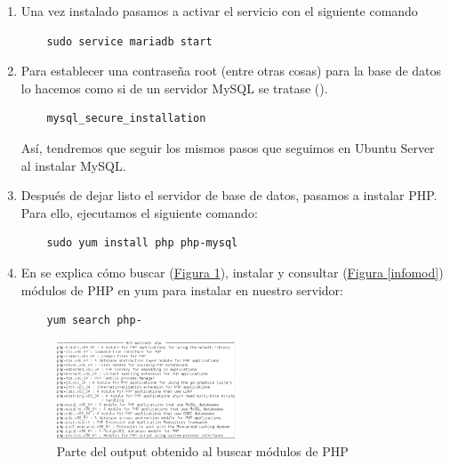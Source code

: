 \documentclass[10pt,a4paper,spanish]{article}
\numberwithin{equation}{section} %
\numberwithin{figure}{section} %
\numberwithin{table}{section} %
\begin{document}
\begin{enumerate}[1.]
    \item Una vez instalado pasamos a activar el servicio con el siguiente comando
    \begin{verbatim}
    sudo service mariadb start
    \end{verbatim}

    \item Para establecer una contraseña root (entre otras cosas) para la base de datos lo hacemos como si de un servidor MySQL se tratase (\cite{mariadb}).
    \begin{verbatim}
    mysql_secure_installation
    \end{verbatim}

    Así, tendremos que seguir los mismos pasos que seguimos en Ubuntu Server al instalar MySQL.

    \item Después de dejar listo el servidor de base de datos, pasamos a instalar PHP. Para ello, ejecutamos el siguiente comando:
    \begin{verbatim}
    sudo yum install php php-mysql        
    \end{verbatim}

    \item En \cite{digocean2} se explica cómo buscar (\hyperref[modulosphp]{Figura \ref*{modulosphp}}), instalar y consultar (\hyperref[infomod]{Figura \ref*{infomod}}) módulos de PHP en yum para instalar en nuestro servidor:
    \begin{verbatim}
    yum search php-
    \end{verbatim}

    \begin{figure}[!h]
        \centering
        \includegraphics[width=0.5\textwidth]{19}
        \caption{Parte del output obtenido al buscar módulos de PHP}
        \label{modulosphp}
    \end{figure}


\end{enumerate}
\end{document}
